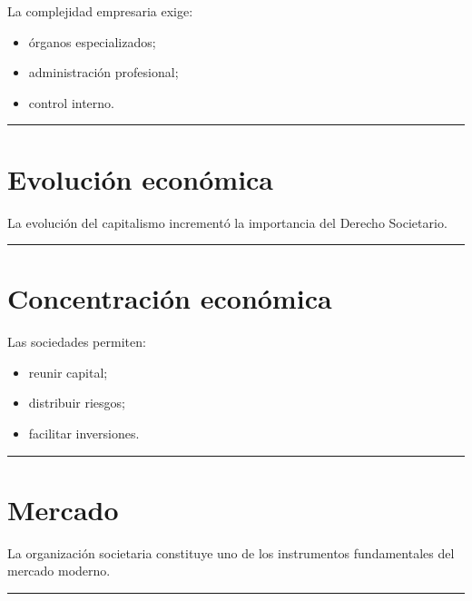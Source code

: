 \documentclass[
  spanish,
  letterpaper,
  DIV=11,
  numbers=noendperiod]{scrartcl}
\providecommand{\tightlist}{%
  \setlength{\itemsep}{0pt}\setlength{\parskip}{0pt}}
\begin{document}
La complejidad empresaria exige:

\begin{itemize}
\tightlist
\item
  órganos especializados;
\item
  administración profesional;
\item
  control interno.
\end{itemize}

\begin{center}\rule{0.5\linewidth}{0.5pt}\end{center}

\section{Evolución económica}\label{evoluciuxf3n-econuxf3mica}

La evolución del capitalismo incrementó la importancia del Derecho
Societario.

\begin{center}\rule{0.5\linewidth}{0.5pt}\end{center}

\section{Concentración económica}\label{concentraciuxf3n-econuxf3mica}

Las sociedades permiten:

\begin{itemize}
\tightlist
\item
  reunir capital;
\item
  distribuir riesgos;
\item
  facilitar inversiones.
\end{itemize}

\begin{center}\rule{0.5\linewidth}{0.5pt}\end{center}

\section{Mercado}\label{mercado}

La organización societaria constituye uno de los instrumentos
fundamentales del mercado moderno.

\begin{center}\rule{0.5\linewidth}{0.5pt}\end{center}
\end{document}
